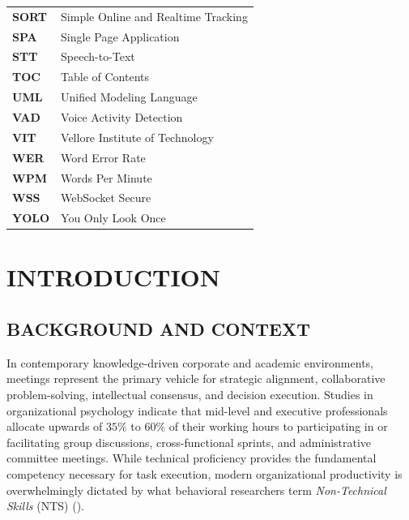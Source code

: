 \documentclass[12pt,a4paper,oneside]{report}
\providecommand{\parencite}[1]{(\cite{#1})}
\begin{document}
\begin{longtable}{@{}p{3.0cm}p{11.0cm}@{}}
\textbf{SORT}    & Simple Online and Realtime Tracking \\
\textbf{SPA}     & Single Page Application \\
\textbf{STT}     & Speech-to-Text \\
\textbf{TOC}     & Table of Contents \\
\textbf{UML}     & Unified Modeling Language \\
\textbf{VAD}     & Voice Activity Detection \\
\textbf{VIT}     & Vellore Institute of Technology \\
\textbf{WER}     & Word Error Rate \\
\textbf{WPM}     & Words Per Minute \\
\textbf{WSS}     & WebSocket Secure \\
\textbf{YOLO}    & You Only Look Once \\
\bottomrule
\end{longtable}


\clearpage
{}
\setcounter{page}{1}

\chapter{INTRODUCTION}

\section{BACKGROUND AND CONTEXT}
In contemporary knowledge-driven corporate and academic environments, meetings represent the primary vehicle for strategic alignment, collaborative problem-solving, intellectual consensus, and decision execution. Studies in organizational psychology indicate that mid-level and executive professionals allocate upwards of $35\%$ to $60\%$ of their working hours to participating in or facilitating group discussions, cross-functional sprints, and administrative committee meetings. While technical proficiency provides the fundamental competency necessary for task execution, modern organizational productivity is overwhelmingly dictated by what behavioral researchers term \textit{Non-Technical Skills} (NTS) \parencite{helmreich2004notechs, fletcher2003notss}. 
\end{document}
